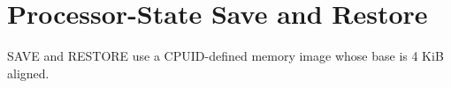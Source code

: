 \clearpage
\section{Processor-State Save and Restore}\label{page:processor-state-save-and-restore}

SAVE and RESTORE use a CPUID-defined memory image whose base is 4 KiB aligned.

